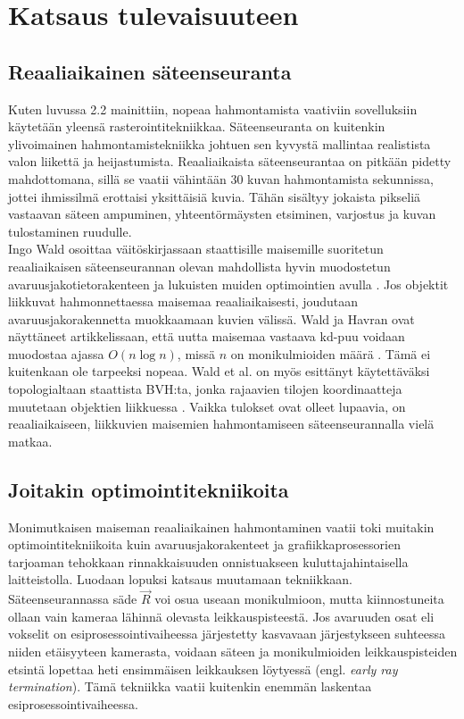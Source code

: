 \documentclass[a4paper, 12pt, titlepage]{article}
\begin{document}
\newpage
\section{Katsaus tulevaisuuteen}
\subsection{Reaaliaikainen säteenseuranta}

Kuten luvussa 2.2 mainittiin, nopeaa hahmontamista vaativiin sovelluksiin käytetään yleensä rasterointitekniikkaa. Säteenseuranta on kuitenkin ylivoimainen hahmontamistekniikka johtuen sen kyvystä mallintaa realistista valon liikettä ja heijastumista. Reaaliaikaista säteenseurantaa on pitkään pidetty mahdottomana, sillä se vaatii vähintään 30 kuvan hahmontamista sekunnissa, jottei ihmissilmä erottaisi yksittäisiä kuvia. Tähän sisältyy jokaista pikseliä vastaavan säteen ampuminen, yhteentörmäysten etsiminen, varjostus ja kuvan tulostaminen ruudulle. \\

Ingo Wald osoittaa väitöskirjassaan staattisille maisemille suoritetun reaaliaikaisen säteenseurannan olevan mahdollista hyvin muodostetun avaruusjakotietorakenteen ja lukuisten muiden optimointien avulla \citep{wald04}. Jos objektit liikkuvat hahmonnettaessa maisemaa reaaliaikaisesti, joudutaan avaruusjakorakennetta muokkaamaan kuvien välissä. Wald ja Havran ovat näyttäneet artikkelissaan, että uutta maisemaa vastaava kd-puu voidaan muodostaa ajassa $O(n \log n)$, missä $n$ on monikulmioiden määrä \citep{wald06}. Tämä ei kuitenkaan ole tarpeeksi nopeaa. Wald et al. on myös esittänyt käytettäväksi topologialtaan staattista BVH:ta, jonka rajaavien tilojen koordinaatteja muutetaan objektien liikkuessa \citep{wald}. Vaikka tulokset ovat olleet lupaavia, on reaaliaikaiseen, liikkuvien maisemien hahmontamiseen säteenseurannalla vielä matkaa. 

\subsection{Joitakin optimointitekniikoita}

Monimutkaisen maiseman reaaliaikainen hahmontaminen vaatii toki muitakin optimointitekniikoita kuin avaruusjakorakenteet ja grafiikkaprosessorien tarjoaman tehokkaan rinnakkaisuuden onnistuakseen kuluttajahintaisella laitteistolla. Luodaan lopuksi katsaus muutamaan tekniikkaan.\\

Säteenseurannassa säde $\vec{R}$ voi osua useaan monikulmioon, mutta kiinnostuneita ollaan vain kameraa lähinnä olevasta leikkauspisteestä. Jos avaruuden osat eli vokselit on esiprosessointivaiheessa järjestetty kasvavaan järjestykseen suhteessa niiden etäisyyteen kamerasta, voidaan säteen ja monikulmioiden leikkauspisteiden etsintä lopettaa heti ensimmäisen leikkauksen löytyessä (engl. \emph{early ray termination}). Tämä tekniikka vaatii kuitenkin enemmän laskentaa esiprosessointivaiheessa. \citep[.]{wald04}\\
\end{document}
